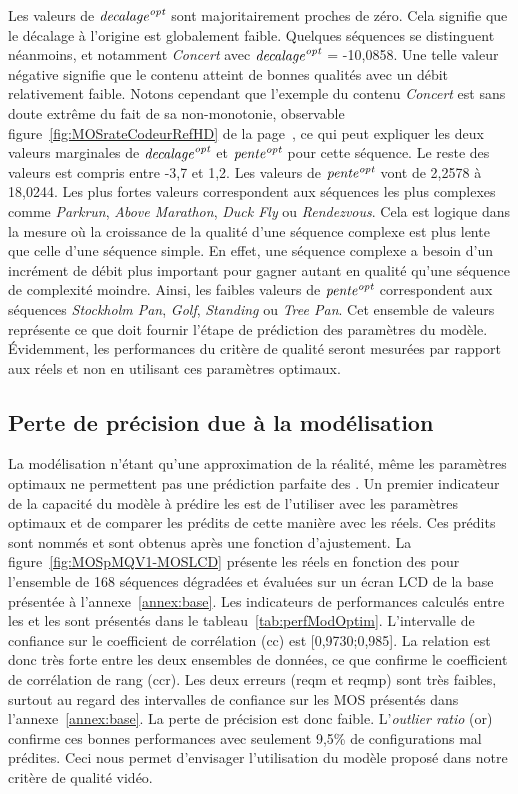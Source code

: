 Les valeurs de $\mathit{decalage}^{\textit{opt}}$ sont majoritairement proches de zéro. Cela signifie que le décalage à l'origine est globalement faible. Quelques séquences se distinguent néanmoins, et notamment \emph{Concert} avec $\mathit{decalage}^{\textit{opt}}$ = -10,0858. Une telle valeur négative signifie que le contenu atteint de bonnes qualités avec un débit relativement faible. Notons cependant que l'exemple du contenu \emph{Concert} est sans doute extrême du fait de sa non-monotonie, observable figure~\ref{fig:MOSrateCodeurRefHD} de la page~\pageref{fig:MOSrateCodeurRefHD}, ce qui peut expliquer les deux valeurs marginales de $\mathit{decalage}^{\textit{opt}}$ et $\mathit{pente}^{\textit{opt}}$ pour cette séquence. Le reste des valeurs est compris entre -3,7 et 1,2. Les valeurs de $\mathit{pente}^{\textit{opt}}$ vont de 2,2578 à 18,0244. Les plus fortes valeurs correspondent aux séquences les plus complexes comme \emph{Parkrun}, \emph{Above Marathon}, \emph{Duck Fly} ou \emph{Rendezvous}. Cela est logique dans la mesure où la croissance de la qualité d'une séquence complexe est plus lente que celle d'une séquence simple. En effet, une séquence complexe a besoin d'un incrément de débit plus important pour gagner autant en qualité qu'une séquence de complexité moindre. Ainsi, les faibles valeurs de $\mathit{pente}^{\textit{opt}}$ correspondent aux séquences \emph{Stockholm Pan}, \emph{Golf}, \emph{Standing} ou \emph{Tree Pan}. Cet ensemble de valeurs représente ce que doit fournir l'étape de prédiction des paramètres du modèle. Évidemment, les performances du critère de qualité seront mesurées par rapport aux \Dcent{} réels et non en utilisant ces paramètres optimaux.


\subsection{Perte de précision due à la modélisation}
La modélisation n'étant qu'une approximation de la réalité, même les paramètres optimaux ne permettent pas une prédiction parfaite des \Dcent. Un premier indicateur de la capacité du modèle à prédire les \Dcent{} est de l'utiliser avec les paramètres optimaux et de comparer les \Dcent{} prédits de cette manière avec les \Dcent{} réels. Ces \Dcent{} prédits sont nommés \DcentOpt{} et sont obtenus après une fonction d'ajustement. La figure~\ref{fig:MOSpMQV1-MOSLCD} présente les \Dcent{} réels en fonction des \DcentOpt{} pour l'ensemble de 168 séquences dégradées et évaluées sur un écran LCD de la base présentée à l'annexe~\ref{annex:base}. Les indicateurs de performances calculés entre les \Dcent{} et les \DcentOpt{} sont présentés dans le tableau~\ref{tab:perfModOptim}. L'intervalle de confiance sur le coefficient de corrélation (cc) est [0,9730;0,985]. La relation est donc très forte entre les deux ensembles de données, ce que confirme le coefficient de corrélation de rang (ccr). Les deux erreurs (reqm et reqmp) sont très faibles, surtout au regard des intervalles de confiance sur les MOS présentés dans l'annexe~\ref{annex:base}. La perte de précision est donc faible. L'\emph{outlier ratio} (or) confirme ces bonnes performances avec seulement 9,5\% de configurations mal prédites. Ceci nous permet d'envisager l'utilisation du modèle proposé dans notre critère de qualité vidéo.

